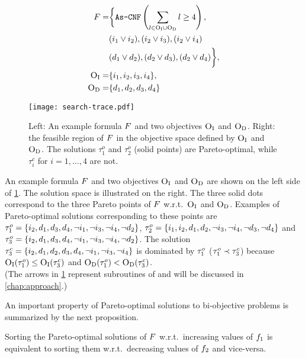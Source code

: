 \begin{figure}
  \begin{minipage}{0.377\textwidth}
    \small
    \begin{align*}
      F = &\bigg\{ \texttt{As-CNF}\left(\sum_ {l \in \textsc{O}_{\text{I}} \cup \textsc{O}_{\text{D}}} l \geq 4 \right), \\
        &(i_1 \lor i_2), (i_2 \lor i_3), (i_2 \lor i_4) \\
        &(d_1 \lor d_2), (d_2 \lor d_3), (d_2 \lor d_4) \bigg\}, \\
      \textsc{O}_{\text{I}} =&\{ i_1, i_2, i_3, i_4 \}, \\
      \textsc{O}_{\text{D}} =&\{ d_1, d_2, d_3, d_4 \} 
    \end{align*}
  \end{minipage}
  \;
  \begin{minipage}{0.605\textwidth}
    \texttt{[image: search-trace.pdf]}
  \end{minipage}
  \caption{Left: An example formula $F$ and two objectives $\textsc{O}_{\text{I}}$ and $\textsc{O}_{\text{D}}$.
    Right: the feasible region of $F$ in the objective space defined by $\textsc{O}_{\text{I}}$ and $\textsc{O}_{\text{D}}$.
    The solutions $\tau^o_1$ and $\tau^o_2$ (solid points) are Pareto-optimal, while $\tau^c_i$ for $i=1,\ldots,4$ are not.\label{fig:search-trace}}
\end{figure}
\begin{example}\label{ex:main}
  An example formula $F$ and two objectives $\textsc{O}_{\text{I}}$ and $\textsc{O}_{\text{D}}$ are shown on the left side of \cref{fig:search-trace}. 
  The solution space is illustrated on the right.
  The three solid dots correspond to the three Pareto points of $F$ w.r.t.\ $\textsc{O}_{\text{I}}$ and $\textsc{O}_{\text{D}}$. 
  Examples of Pareto-optimal solutions corresponding to these points are $\tau^o_1 = \{i_2,\allowbreak d_1,\allowbreak d_3,\allowbreak d_4,\allowbreak \lnot i_1,\allowbreak \lnot i_3,\allowbreak \lnot i_4,\allowbreak \lnot d_2\}$, $\tau^o_2 = \{i_1,\allowbreak i_2,\allowbreak d_1,\allowbreak d_2,\allowbreak \lnot i_3,\allowbreak \lnot i_4,\allowbreak \lnot d_3,\allowbreak \lnot d_4\}$ and $\tau^o_3 = \{i_2,\allowbreak d_1,\allowbreak d_3,\allowbreak d_4,\allowbreak \lnot i_1,\allowbreak \lnot i_3,\allowbreak \lnot i_4,\allowbreak \lnot d_2\}$.
  The solution $\tau^c_3 = \{i_2,\allowbreak d_1,\allowbreak d_2,\allowbreak d_3,\allowbreak d_4,\allowbreak \lnot i_1,\allowbreak \lnot i_3,\allowbreak \lnot i_4\}$ is dominated by $\tau^o_1$ ($\tau^o_1 \prec \tau^c_3$) because $\textsc{O}_{\text{I}}(\tau^o_1) \leq \textsc{O}_{\text{I}}(\tau^c_3)$ and $\textsc{O}_{\text{D}}(\tau^o_1) < \textsc{O}_{\text{D}}(\tau^c_3)$. \\
  (The arrows in \cref{fig:search-trace} represent subroutines of \algname{} and will be discussed in \cref{chap:approach}.)
\end{example}

An important property of Pareto-optimal solutions to bi-objective problems is summarized by the next proposition.
\begin{proposition} \label{prop:biobjective}
  Sorting the Pareto-optimal solutions of $F$ w.r.t.\ increasing values of $f_1$ is equivalent to sorting them w.r.t.\ decreasing values of $f_2$ and vice-versa.
\end{proposition}

